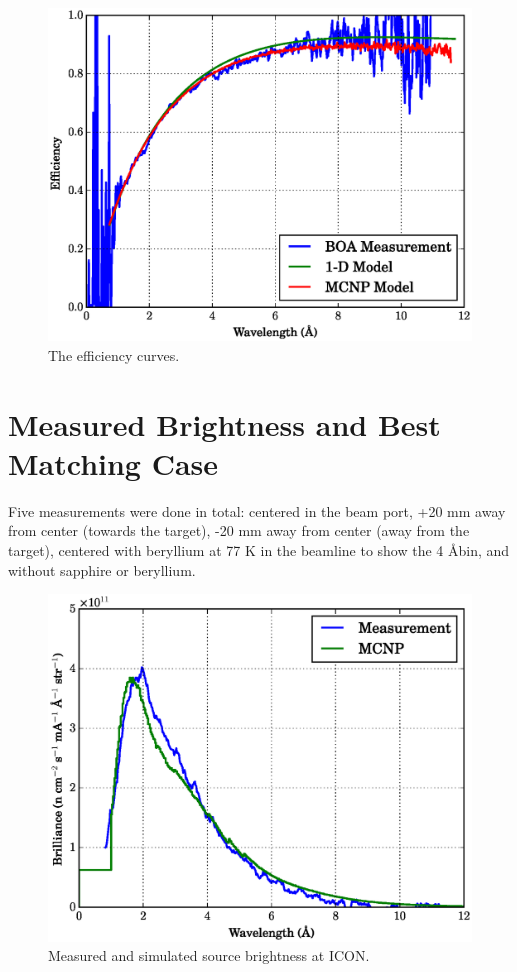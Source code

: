 \documentclass[preprint,12pt]{elsarticle}
\begin{document}
\begin{figure}[h!] 
  \centering
    \includegraphics[width=\textwidth]{graphics/eff.eps}
     \caption{The efficiency curves. \label{fig:eff} }
\end{figure}



\section{Measured Brightness and Best Matching Case}
\label{sec:results}

Five measurements were done in total: centered in the beam port, +20 mm away from center (towards the target), -20 mm away from center (away from the target), centered with beryllium at 77 K in the beamline to show the 4 \AA bin, and without sapphire or beryllium.

\begin{figure}[h!] 
  \centering
    \includegraphics[width=\textwidth]{graphics/brightness.eps}
     \caption{Measured and simulated source brightness at ICON. \label{fig:brightness} }
\end{figure}
\end{document}
